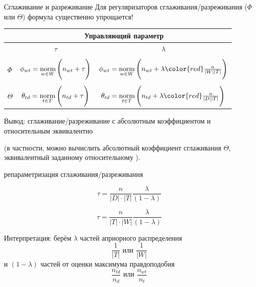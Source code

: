 \begin{frame}{Сглаживание и разреживание}
Для регуляризаторов сглаживания/разреживания ($\Phi$ или $\Theta$) формула существенно упрощается!

\begin{table}[]
\begin{tabular}{l|c|c|}
         & \multicolumn{2}{c}{Управляющий параметр}                                                                                                      \\ \hline
         & $\tau$                                          & $\lambda$                                                                                   \\ \hline 
         &    &          \\[-5pt]
$\Phi$   & $\phi_{wt} = \mathop{\mathrm{norm}}\limits_{w \in W}\Bigg(n_{wt} + \tau\Bigg)$    & $\phi_{wt} = \norm_{w \in W}\Bigg(n_{wt} + \lambda {\color{red}\frac{n}{|W||T|}}\Bigg)$    \\[15pt] \hline
         &    &          \\[-5pt]
$\Theta$ & $\theta_{td} = \mathop{\mathrm{norm}}\limits_{t \in T} \Bigg(n_{td} + \tau\Bigg)$ & $\theta_{td} = \norm_{t \in T} \Bigg(n_{td} + \lambda {\color{red}\frac{n}{|D| |T|}}\Bigg)$ \\[15pt]  \hline
\end{tabular}
\end{table}
Вывод: сглаживание/разреживание с абсолютным коэффициентом и относительным эквивалентно 

\small
(в частности, можно вычислить абсолютный коэффициент сглаживания $\Theta$, эквивалентный заданному относительному ).

\end{frame}

\begin{frame}{репараметризация сглаживания/разреживания}
	
\begin{equation}
\tau = \frac{n}{|D| \cdot |T|} \frac{\lambda}{(1-\lambda)}
\end{equation}

\begin{equation}
\tau = \frac{n}{|T|\cdot|W|} \frac{\lambda}{(1-\lambda)}  
\end{equation}

Интерпретация: берём $\lambda$ частей априорного распределения
\[
\frac{1}{|T|}\text{ или }\frac{1}{|W|}
\]
и $(1-\lambda)$ частей от оценки максимума правдоподобия 
\[
\frac{n_{td}}{n_d}\text{ или }\frac{n_{wt}}{n_t}
\]


\end{frame}

